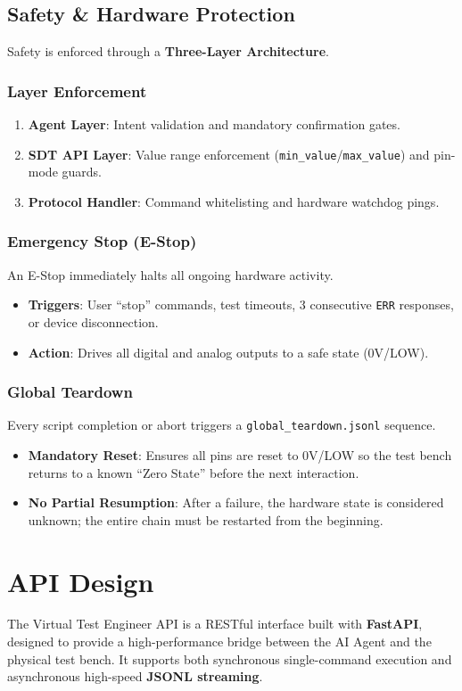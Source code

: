 \documentclass[conference]{IEEEtran}
\begin{document}
\subsection{Safety \& Hardware Protection}
Safety is enforced through a \textbf{Three-Layer Architecture}.
\subsubsection{Layer Enforcement}
\begin{enumerate}
    \item \textbf{Agent Layer}: Intent validation and mandatory confirmation gates.
    \item \textbf{SDT API Layer}: Value range enforcement (\texttt{min\_value}/\texttt{max\_value}) and pin-mode guards.
    \item \textbf{Protocol Handler}: Command whitelisting and hardware watchdog pings.
\end{enumerate}
\subsubsection{Emergency Stop (E-Stop)}
An E-Stop immediately halts all ongoing hardware activity.
\begin{itemize}
    \item \textbf{Triggers}: User ``stop'' commands, test timeouts, 3 consecutive \texttt{ERR} responses, or device disconnection.
    \item \textbf{Action}: Drives all digital and analog outputs to a safe state (0V/LOW).
\end{itemize}
\subsubsection{Global Teardown}
Every script completion or abort triggers a \texttt{global\_teardown.jsonl} sequence.
\begin{itemize}
    \item \textbf{Mandatory Reset}: Ensures all pins are reset to 0V/LOW so the test bench returns to a known ``Zero State'' before the next interaction.
    \item \textbf{No Partial Resumption}: After a failure, the hardware state is considered unknown; the entire chain must be restarted from the beginning.
\end{itemize}

\section{API Design}
The Virtual Test Engineer API is a RESTful interface built with \textbf{FastAPI}, designed to provide a high-performance bridge between the AI Agent and the physical test bench. It supports both synchronous single-command execution and asynchronous high-speed \textbf{JSONL streaming}.
\end{document}
